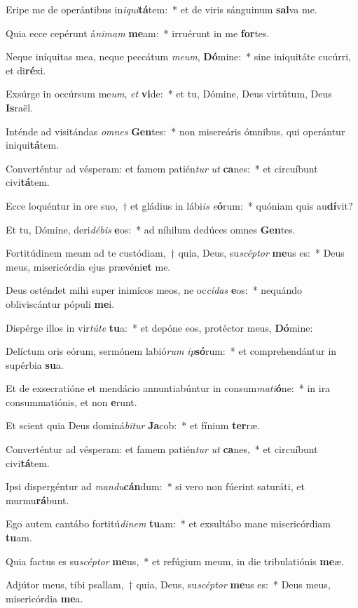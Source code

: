 \item Eripe me de operántibus in\textit{i}\textit{qui}\textbf{tá}tem:~* et de viris sánguinum \textbf{sal}va me.
\item Quia ecce cepérunt á\textit{ni}\textit{mam} \textbf{me}am:~* irruérunt in me \textbf{for}tes.
\item Neque iníquitas mea, neque peccátum \textit{me}\textit{um}, \textbf{Dó}mine:~* sine iniquitáte cucúrri, et di\textbf{ré}xi.
\item Exsúrge in occúrsum me\textit{um}, \textit{et} \textbf{vi}de:~* et tu, Dómine, Deus virtútum, Deus \textbf{Is}raël.
\item Inténde ad visitándas \textit{om}\textit{nes} \textbf{Gen}tes:~* non misereáris ómnibus, qui operántur iniqui\textbf{tá}tem.
\item Converténtur ad vésperam: et famem patién\textit{tur} \textit{ut} \textbf{ca}nes:~* et circuíbunt civi\textbf{tá}tem.
\item Ecce loquéntur in ore suo,~† et gládius in lábi\textit{is} \textit{e}\textbf{ó}rum:~* quóniam quis au\textbf{dí}vit?
\item Et tu, Dómine, deri\textit{dé}\textit{bis} \textbf{e}os:~* ad níhilum dedúces omnes \textbf{Gen}tes.
\item Fortitúdinem meam ad te custódiam,~† quia, Deus, su\textit{scép}\textit{tor} \textbf{me}us es:~* Deus meus, misericórdia ejus prævéni\textbf{et} me.
\item Deus osténdet mihi super inimícos meos, ne oc\textit{cí}\textit{das} \textbf{e}os:~* nequándo obliviscántur pópuli \textbf{me}i.
\item Dispérge illos in vir\textit{tú}\textit{te} \textbf{tu}a:~* et depóne eos, protéctor meus, \textbf{Dó}mine:
\item Delíctum oris eórum, sermónem labió\textit{rum} \textit{ip}\textbf{só}rum:~* et comprehendántur in supérbia \textbf{su}a.
\item Et de exsecratióne et mendácio annuntiabúntur in consum\textit{ma}\textit{ti}\textbf{ó}ne:~* in ira consummatiónis, et non \textbf{e}runt.
\item Et scient quia Deus dominá\textit{bi}\textit{tur} \textbf{Ja}cob:~* et fínium \textbf{ter}ræ.
\item Converténtur ad vésperam: et famem patién\textit{tur} \textit{ut} \textbf{ca}nes,~* et circuíbunt civi\textbf{tá}tem.
\item Ipsi dispergéntur ad \textit{man}\textit{du}\textbf{cán}dum:~* si vero non fúerint saturáti, et murmu\textbf{rá}bunt.
\item Ego autem cantábo fortitú\textit{di}\textit{nem} \textbf{tu}am:~* et exsultábo mane misericórdiam \textbf{tu}am.
\item Quia factus es su\textit{scép}\textit{tor} \textbf{me}us,~* et refúgium meum, in die tribulatiónis \textbf{me}æ.
\item Adjútor meus, tibi psallam,~† quia, Deus, su\textit{scép}\textit{tor} \textbf{me}us es:~* Deus meus, misericórdia \textbf{me}a.
